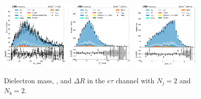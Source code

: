 \begin{figure}[htb!]
    \centering
    \includegraphics[width=0.3\textwidth]{chapters/Appendix/sectionPlots/figures/data_mc_overlays/etau_2016_cat_eq2_eq2_signal_linear_lepton_dilepton1_mass}
    \includegraphics[width=0.3\textwidth]{chapters/Appendix/sectionPlots/figures/data_mc_overlays/etau_2016_cat_eq2_eq2_signal_linear_lepton_dilepton1_pt}
    \includegraphics[width=0.3\textwidth]{chapters/Appendix/sectionPlots/figures/data_mc_overlays/etau_2016_cat_eq2_eq2_signal_linear_lepton_dilepton1_delta_r}
    \caption{Dielectron mass, \pt, and $\Delta R$ in the $e\tau$ channel
    with $N_{j} = 2$ and $N_{b} = 2$.}
    \label{fig:etau_6_dilepton}
\end{figure}

